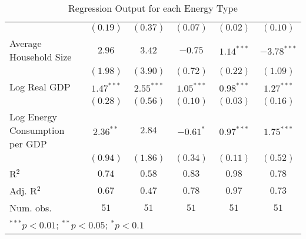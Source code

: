 \begin{table}
\begin{center}
\begin{tabular}{l c c c c c}
                                          & $(0.19)$      & $(0.37)$      & $(0.07)$     & $(0.02)$     & $(0.10)$      \\
Average Household Size                    & $2.96$        & $3.42$        & $-0.75$      & $1.14^{***}$ & $-3.78^{***}$ \\
                                          & $(1.98)$      & $(3.90)$      & $(0.72)$     & $(0.22)$     & $(1.09)$      \\
Log Real GDP                              & $1.47^{***}$  & $2.55^{***}$  & $1.05^{***}$ & $0.98^{***}$ & $1.27^{***}$  \\
                                          & $(0.28)$      & $(0.56)$      & $(0.10)$     & $(0.03)$     & $(0.16)$      \\
Log Energy Consumption per GDP            & $2.36^{**}$   & $2.84$        & $-0.61^{*}$  & $0.97^{***}$ & $1.75^{***}$  \\
                                          & $(0.94)$      & $(1.86)$      & $(0.34)$     & $(0.11)$     & $(0.52)$      \\
\hline
R$^2$                                     & $0.74$        & $0.58$        & $0.83$       & $0.98$       & $0.78$        \\
Adj. R$^2$                                & $0.67$        & $0.47$        & $0.78$       & $0.97$       & $0.73$        \\
Num. obs.                                 & $51$          & $51$          & $51$         & $51$         & $51$          \\
\hline
\multicolumn{6}{l}{\scriptsize{$^{***}p<0.01$; $^{**}p<0.05$; $^{*}p<0.1$}}
\end{tabular}
\caption{Regression Output for each Energy Type}
\label{table:coefficients}
\end{center}
\end{table}
